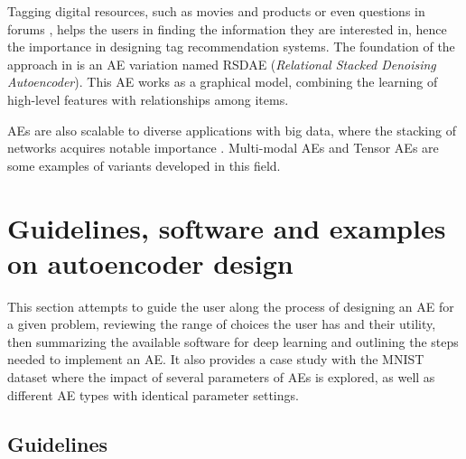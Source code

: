 Tagging digital resources, such as movies and products \cite{TagRecommendation} or even questions in forums \cite{QUINTA}, helps the users in finding the information they are interested in, hence the importance in designing tag recommendation systems. The foundation of the approach in \cite{RelationalDAE} is an AE variation named  RSDAE (\textit{Relational Stacked Denoising Autoencoder}). This AE works as a graphical model, combining the learning of high-level features with relationships among items.

AEs are also scalable to diverse applications with big data, where the stacking of networks acquires notable importance \cite{SurveyDLbigdata}. Multi-modal AEs and Tensor AEs are some examples of variants developed in this field.

\section{Guidelines, software and examples on autoencoder design}\label{Sec.HowToChoose}

This section attempts to guide the user along the process of designing an AE for a given problem, reviewing the range of choices the user has and their utility, then summarizing the available software for deep learning and outlining the steps needed to implement an AE. It also provides a case study with the MNIST dataset where the impact of several parameters of AEs is explored, as well as different AE types with identical parameter settings.


\subsection{Guidelines}

